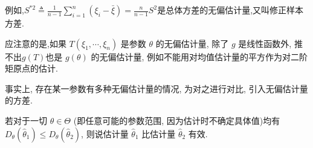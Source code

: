 \documentclass[10pt]{yerbaformat}
\begin{document}
\par 例如,$S^{* 2} \triangleq \frac{1}{n-1} \sum_{i=1}^{n}\left(\xi_{i}-\bar{\xi}\right)=\frac{n}{n-1} S^{2}$是总体方差的无偏估计量,又叫修正样本方差.

\par 应注意的是,如果 $T\left(\xi_{1}, \cdots, \xi_{n}\right)$ 是参数 $\theta$ 的无偏估计量, 除了 $g$ 是线性函数外, 推不出$g(T)$也是 $g(\theta)$ 的无偏估计量, 例如不能用对均值估计量的平方作为对二阶矩原点的估计.

\par 事实上, 存在某一参数有多种无偏估计量的情况, 为对之进行对比, 引入无偏估计量的方差.

\begin{definition}
    若对于一切 $\theta \in \Theta$ (即任意可能的参数范围, 因为估计时不确定具体值)均有 $D_{\theta}\left(\hat{\theta}_{1}\right) \leqslant D_{\theta}\left(\hat{\theta}_{2}\right)$, 则说估计量 $\hat{\theta}_{1}$ 比估计量 $\hat{\theta}_{2}$ 有效.
\end{definition}
\end{document}
